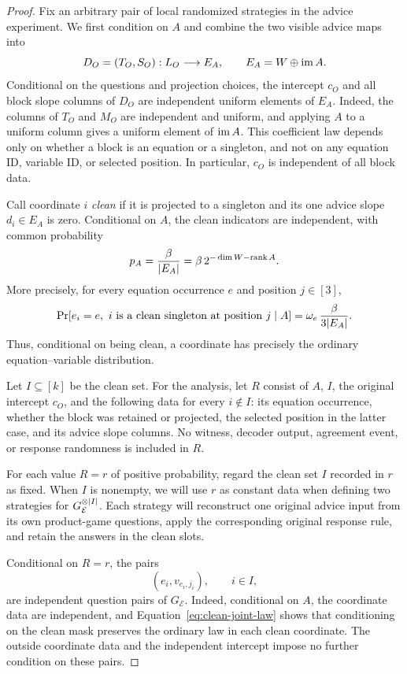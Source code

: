 \begin{proof}
Fix an arbitrary pair of local randomized strategies in the advice
experiment.  We first condition on $A$ and combine the two visible
advice maps into
\[
 D_O=(T_O,S_O):L_O\longrightarrow E_A,
 \qquad E_A=W\oplus\operatorname{im} A.
\]
Conditional on the questions and projection choices, the intercept
$c_O$ and all block slope columns of $D_O$ are independent uniform
elements of $E_A$.  Indeed, the columns of $T_O$ and $M_O$ are
independent and uniform, and applying $A$ to a uniform column gives a
uniform element of $\operatorname{im} A$.  This coefficient law depends only on
whether a block is an equation or a singleton, and not on any equation
ID, variable ID, or selected position.  In particular, $c_O$ is
independent of all block data.

Call coordinate $i$ \emph{clean} if it is projected to a singleton
and its one advice slope $d_i\in E_A$ is zero.  Conditional on $A$,
the clean indicators are independent, with common probability
\begin{equation}
 p_A=\frac{\beta}{\lvert E_A\rvert}
     =\beta\,2^{-\dim W-\operatorname{rank} A}.
 \label{eq:clean-probability}
\end{equation}
More precisely, for every equation occurrence $e$ and position
$j\in[3]$,
\begin{equation}
 \Pr[e_i=e,\ i\text{ is a clean singleton at position }j\mid A]
 =\omega_e\,\frac{\beta}{3\lvert E_A\rvert}.
 \label{eq:clean-joint-law}
\end{equation}
Thus, conditional on being clean, a coordinate has precisely the
ordinary equation--variable distribution.

Let $I\subseteq[k]$ be the clean set.  For the analysis, let $R$ consist
of $A$, $I$, the original intercept $c_O$, and the following data for
every $i\notin I$: its equation occurrence, whether the block was
retained or projected, the selected position in the latter case, and
its advice slope columns.  No witness, decoder output, agreement event,
or response randomness is included in $R$.

For each value $R=r$ of positive probability, regard the clean set
$I$ recorded in $r$ as fixed.  When $I$ is nonempty, we will use $r$
as constant data when defining two strategies for
$G_{\mathcal E}^{\otimes\lvert I\rvert}$.
Each strategy will reconstruct one original advice input from its own
product-game questions, apply the corresponding original response rule,
and retain the answers in the clean slots.

Conditional on $R=r$, the pairs
\[
 (e_i,v_{e_i,j_i}),\qquad i\in I,
\]
are independent question pairs of $G_{\mathcal E}$.  Indeed, conditional
on $A$, the coordinate data are independent, and
Equation~\eqref{eq:clean-joint-law} shows that conditioning on the clean
mask preserves the ordinary law in each clean coordinate.  The outside
coordinate data and the independent intercept impose no further
condition on these pairs.


\end{proof}
